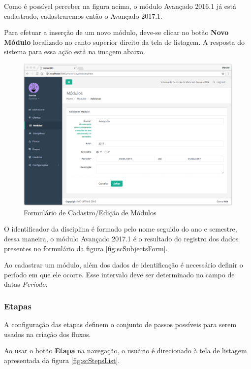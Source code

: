Como é possível perceber na figura acima, o módulo Avançado 2016.1 já está cadastrado, cadastraremos então o Avançado 2017.1. 

Para efetuar a inserção de um novo módulo, deve-se clicar no botão \textbf{Novo Módulo} localizado no canto superior direito da tela de listagem. A resposta do sistema para essa ação está na imagem abaixo.

\begin{figure}[H]
\centering
     \includegraphics[width=1.0\textwidth]{Screens/ModulesForm.png}
      \caption{Formulário de Cadastro/Edição de Módulos}
       \label{fig:scModulesForm}
\end{figure}

O identificador da disciplina é formado pelo nome seguido do ano e semestre, dessa maneira, o módulo Avançado 2017.1 é o resultado do registro dos dados presentes no formulário da figura \hyperref[fig:scSubjectsForm]{\ref{fig:scSubjectsForm}}. 

Ao cadastrar um módulo, além dos dados de identificação é necessário definir o período em que ele ocorre. Esse intervalo deve ser determinado no campo de datas \textit{Período}.

\subsubsection{Etapas}

A configuração das etapas definem o conjunto de passos possíveis para serem usados na criação dos fluxos.

Ao usar o botão \textbf{Etapa} na navegação, o usuário é direcionado à tela de listagem apresentada da figura \hyperref[fig:scStepsList]{\ref{fig:scStepsList}}.

